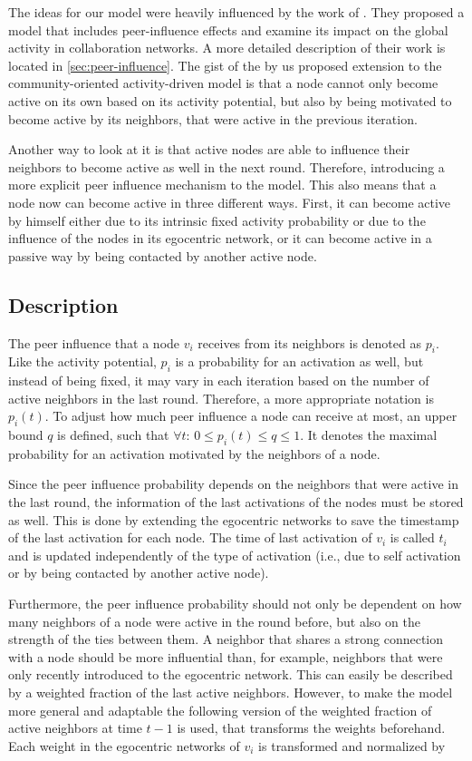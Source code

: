 The ideas for our model were heavily influenced by the work of \citet{Walk2016}.
They proposed a model that includes peer-influence effects and examine its impact on the global activity in collaboration networks.
A more detailed description of their work is located in \cref{sec:peer-influence}.
The gist of the by us proposed extension to the community-oriented activity-driven model is that a node cannot only become active on its own based on its activity potential, but also by being motivated to become active by its neighbors, that were active in the previous iteration.

Another way to look at it is that active nodes are able to influence their neighbors to become active as well in the next round.
Therefore, introducing a more explicit peer influence mechanism to the model.
This also means that a node now can become active in three different ways.
First, it can become active by himself either due to its intrinsic fixed activity probability or due to the influence of the nodes in its egocentric network, or it can become active in a passive way by being contacted by another active node.


\subsection{Description}

The peer influence that a node \( v_{i} \) receives from its neighbors is denoted as \( p_{i} \).
Like the activity potential, \( p_{i} \) is a probability for an activation as well, but instead of being fixed, it may vary in each iteration based on the number of active neighbors in the last round.
Therefore, a more appropriate notation is \( p_{i}(t) \).
To adjust how much peer influence a node can receive at most, an upper bound \( q \) is defined, such that \( \forall t: \, 0 \leq p_{i}(t) \leq q \leq 1 \).
It denotes the maximal probability for an activation motivated by the neighbors of a node.

Since the peer influence probability depends on the neighbors that were active in the last round, the information of the last activations of the nodes must be stored as well.
This is done by extending the egocentric networks to save the timestamp of the last activation for each node.
The time of last activation of \( v_{i} \) is called \( t_{i} \) and is updated independently of the type of activation (i.e., due to self activation or by being contacted by another active node).

Furthermore, the peer influence probability should not only be dependent on how many neighbors of a node were active in the round before, but also on the strength of the ties between them.
A neighbor that shares a strong connection with a node should be more influential than, for example, neighbors that were only recently introduced to the egocentric network.
This can easily be described by a weighted fraction of the last active neighbors.
However, to make the model more general and adaptable the following version of the weighted fraction of active neighbors at time \( t - 1 \) is used, that transforms the weights beforehand.
Each weight in the egocentric networks of \( v_{i} \) is transformed and normalized by

